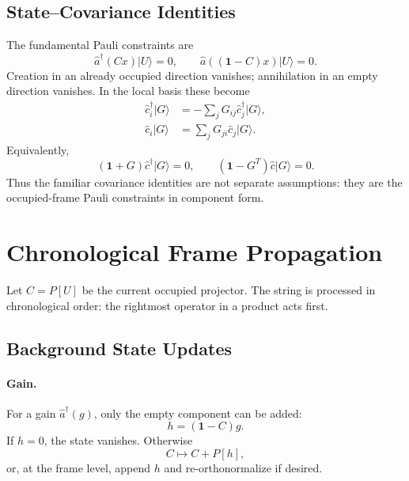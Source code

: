 \documentclass[aps,prb,onecolumn,nofootinbib,superscriptaddress]{revtex4-2}
\newcommand{\Id}{\mathbf{1}}
\newcommand{\ket}[1]{\lvert #1\rangle}
\newcommand{\ahat}{\hat a}
\newcommand{\chat}{\hat c}
\begin{document}
\subsection{State--Covariance Identities}

The fundamental Pauli constraints are
\begin{equation}
  \ahat^\dagger(Cx)\ket{U}=0,\qquad
  \ahat((\Id-C)x)\ket{U}=0 .
  \label{eq:frame-pauli}
\end{equation}
Creation in an already occupied direction vanishes; annihilation in an empty
direction vanishes.  In the local basis these become
\begin{align}
  \chat_i^\dagger\ket{G}
  &=
  -\sum_j G_{ij}\chat_j^\dagger\ket{G},
  \label{eq:creation-cov-identity}
  \\
  \chat_i\ket{G}
  &=
  \sum_j G_{ji}\chat_j\ket{G}.
  \label{eq:annihilation-cov-identity}
\end{align}
Equivalently,
\begin{equation}
  (\Id+G)\chat^\dagger\ket{G}=0,\qquad
  (\Id-G^T)\chat\ket{G}=0 .
\end{equation}
Thus the familiar covariance identities are not separate assumptions: they
are the occupied-frame Pauli constraints in component form.

\section{Chronological Frame Propagation}

Let \(C=P[U]\) be the current occupied projector.  The string is processed in
chronological order: the rightmost operator in a product acts first.

\subsection{Background State Updates}

\paragraph*{Gain.}
For a gain \(\ahat^\dagger(g)\), only the empty component can be added:
\begin{equation}
  h=(\Id-C)g.
\end{equation}
If \(h=0\), the state vanishes.  Otherwise
\begin{equation}
  C\longmapsto C+P[h],
  \label{eq:gain-background}
\end{equation}
or, at the frame level, append \(h\) and re-orthonormalize if desired.
\end{document}
